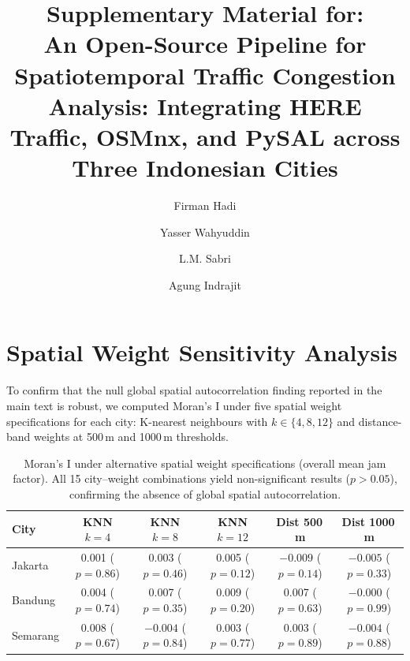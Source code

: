 \documentclass[preprint,12pt]{elsarticle}
\begin{document}
\begin{frontmatter}

\title{Supplementary Material for:\\
An Open-Source Pipeline for Spatiotemporal Traffic Congestion Analysis: Integrating HERE Traffic, OSMnx, and PySAL across Three Indonesian Cities}

\author[ugm]{Firman Hadi}
\author[undip]{Yasser Wahyuddin}
\author[undip]{L.M. Sabri}
\author[its]{Agung Indrajit}



\end{frontmatter}

\setcounter{section}{0}
\renewcommand{\thesection}{S\arabic{section}}
\renewcommand{\thetable}{S\arabic{table}}
\renewcommand{\thefigure}{S\arabic{figure}}

\section{Spatial Weight Sensitivity Analysis}
\label{sec:s1}

To confirm that the null global spatial autocorrelation finding reported in the main text is robust, we computed Moran's I under five spatial weight specifications for each city: K-nearest neighbours with $k \in \{4, 8, 12\}$ and distance-band weights at 500\,m and 1000\,m thresholds.

\begin{table}[!htbp]
\centering
\caption{Moran's I under alternative spatial weight specifications (overall mean jam factor). All 15 city--weight combinations yield non-significant results ($p > 0.05$), confirming the absence of global spatial autocorrelation.}
\label{tab:s1}
\begin{tabular}{lccccc}
\toprule
City & KNN $k{=}4$ & KNN $k{=}8$ & KNN $k{=}12$ & Dist 500\,m & Dist 1000\,m \\
\midrule
Jakarta  & 0.001 ($p{=}0.86$) & 0.003 ($p{=}0.46$) & 0.005 ($p{=}0.12$) & $-0.009$ ($p{=}0.14$) & $-0.005$ ($p{=}0.33$) \\
Bandung  & 0.004 ($p{=}0.74$) & 0.007 ($p{=}0.35$) & 0.009 ($p{=}0.20$) & 0.007 ($p{=}0.63$)    & $-0.000$ ($p{=}0.99$) \\
Semarang & 0.008 ($p{=}0.67$) & $-0.004$ ($p{=}0.84$) & 0.003 ($p{=}0.77$) & 0.003 ($p{=}0.89$) & $-0.004$ ($p{=}0.88$) \\
\bottomrule
\end{tabular}
\end{table}
\end{document}
